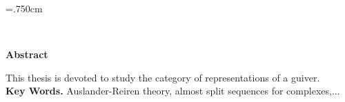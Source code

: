 \baselineskip=.750cm
\thispagestyle{empty}
\begin{latin}

~~
\vspace{1.5cm}

\begin{flushleft}
\begin{Huge}
{\bf Abstract}
\end{Huge}
\end{flushleft} 
\vspace{0.8cm}
This thesis is devoted to study the category of representations of a guiver. 
\vspace{0.75cm}
\\{\bf Key Words.} Auslander-Reiren theory, almost split sequences for complexes,...
\end{latin}